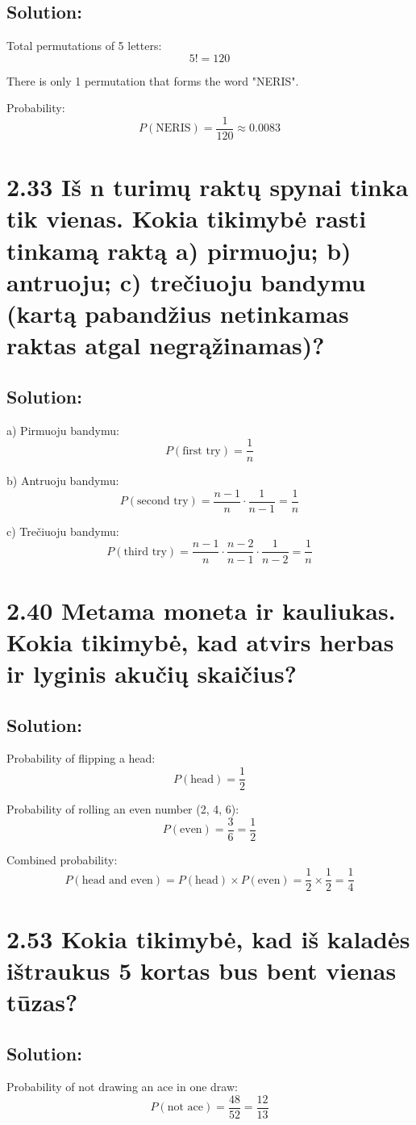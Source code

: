 \documentclass{article}
\begin{document}
{\subsection*{Solution:}
Total permutations of 5 letters:
\[
5! = 120
\]

There is only 1 permutation that forms the word "NERIS". 

Probability:
\[
P(\text{NERIS}) = \frac{1}{120} \approx 0.0083
\]

\section*{2.33 Iš n turimų raktų spynai tinka tik vienas. Kokia tikimybė rasti tinkamą raktą a) pirmuoju; b) antruoju; c) trečiuoju bandymu (kartą pabandžius netinkamas raktas atgal negrąžinamas)?}
\subsection*{Solution:}
a) Pirmuoju bandymu:
\[
P(\text{first try}) = \frac{1}{n}
\]

b) Antruoju bandymu:
\[
P(\text{second try}) = \frac{n-1}{n} \cdot \frac{1}{n-1} = \frac{1}{n}
\]

c) Trečiuoju bandymu:
\[
P(\text{third try}) = \frac{n-1}{n} \cdot \frac{n-2}{n-1} \cdot \frac{1}{n-2} = \frac{1}{n}
\]

\section*{2.40 Metama moneta ir kauliukas. Kokia tikimybė, kad atvirs herbas ir lyginis akučių skaičius?}
\subsection*{Solution:}
Probability of flipping a head:
\[
P(\text{head}) = \frac{1}{2}
\]

Probability of rolling an even number (2, 4, 6):
\[
P(\text{even}) = \frac{3}{6} = \frac{1}{2}
\]

Combined probability:
\[
P(\text{head and even}) = P(\text{head}) \times P(\text{even}) = \frac{1}{2} \times \frac{1}{2} = \frac{1}{4}
\]

\section*{2.53 Kokia tikimybė, kad iš kaladės ištraukus 5 kortas bus bent vienas tūzas?}
\subsection*{Solution:}
Probability of not drawing an ace in one draw:
\[
P(\text{not ace}) = \frac{48}{52} = \frac{12}{13}
\]

}
\end{document}
